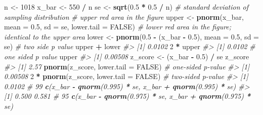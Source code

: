 \documentclass[]{book}
\newenvironment{Shaded}{\begin{snugshade}}{\end{snugshade}}
\newcommand{\KeywordTok}[1]{\textcolor[rgb]{0.13,0.29,0.53}{\textbf{#1}}}
\newcommand{\DataTypeTok}[1]{\textcolor[rgb]{0.13,0.29,0.53}{#1}}
\newcommand{\DecValTok}[1]{\textcolor[rgb]{0.00,0.00,0.81}{#1}}
\newcommand{\FloatTok}[1]{\textcolor[rgb]{0.00,0.00,0.81}{#1}}
\newcommand{\StringTok}[1]{\textcolor[rgb]{0.31,0.60,0.02}{#1}}
\newcommand{\CommentTok}[1]{\textcolor[rgb]{0.56,0.35,0.01}{\textit{#1}}}
\newcommand{\OtherTok}[1]{\textcolor[rgb]{0.56,0.35,0.01}{#1}}
\newcommand{\OperatorTok}[1]{\textcolor[rgb]{0.81,0.36,0.00}{\textbf{#1}}}
\newcommand{\NormalTok}[1]{#1}
\theoremstyle{definition}
\theoremstyle{definition}
\theoremstyle{definition}
\theoremstyle{remark}
\begin{document}
\begin{Shaded}
\begin{Highlighting}[]
\NormalTok{n <-}\StringTok{ }\DecValTok{1018}
\NormalTok{x_bar <-}\StringTok{ }\DecValTok{550} \OperatorTok{/}\StringTok{ }\NormalTok{n}
\NormalTok{se <-}\StringTok{ }\KeywordTok{sqrt}\NormalTok{(}\FloatTok{0.5} \OperatorTok{*}\StringTok{ }\FloatTok{0.5} \OperatorTok{/}\StringTok{ }\NormalTok{n) }\CommentTok{# standard deviation of sampling distribution}
\CommentTok{# upper red area in the figure}
\NormalTok{upper <-}\StringTok{ }\KeywordTok{pnorm}\NormalTok{(x_bar, }\DataTypeTok{mean =} \FloatTok{0.5}\NormalTok{, }\DataTypeTok{sd =}\NormalTok{ se, }\DataTypeTok{lower.tail =} \OtherTok{FALSE}\NormalTok{)}
\CommentTok{# lower red area in the figure; identical to the upper area}
\NormalTok{lower <-}\StringTok{ }\KeywordTok{pnorm}\NormalTok{(}\FloatTok{0.5} \OperatorTok{-}\StringTok{ }\NormalTok{(x_bar }\OperatorTok{-}\StringTok{ }\FloatTok{0.5}\NormalTok{), }\DataTypeTok{mean =} \FloatTok{0.5}\NormalTok{, }\DataTypeTok{sd =}\NormalTok{ se)}
\CommentTok{# two side p value}
\NormalTok{upper }\OperatorTok{+}\StringTok{ }\NormalTok{lower}
\CommentTok{#> [1] 0.0102}
\DecValTok{2} \OperatorTok{*}\StringTok{ }\NormalTok{upper}
\CommentTok{#> [1] 0.0102}
\CommentTok{# one sided p value}
\NormalTok{upper}
\CommentTok{#> [1] 0.00508}
\NormalTok{z_score <-}\StringTok{ }\NormalTok{(x_bar }\OperatorTok{-}\StringTok{ }\FloatTok{0.5}\NormalTok{) }\OperatorTok{/}\StringTok{ }\NormalTok{se}
\NormalTok{z_score}
\CommentTok{#> [1] 2.57}
\KeywordTok{pnorm}\NormalTok{(z_score, }\DataTypeTok{lower.tail =} \OtherTok{FALSE}\NormalTok{) }\CommentTok{# one-sided p-value}
\CommentTok{#> [1] 0.00508}
\DecValTok{2} \OperatorTok{*}\StringTok{ }\KeywordTok{pnorm}\NormalTok{(z_score, }\DataTypeTok{lower.tail =} \OtherTok{FALSE}\NormalTok{) }\CommentTok{# two-sided p-value}
\CommentTok{#> [1] 0.0102}
\CommentTok{# 99% confidence interval contains 0.5}
\KeywordTok{c}\NormalTok{(x_bar }\OperatorTok{-}\StringTok{ }\KeywordTok{qnorm}\NormalTok{(}\FloatTok{0.995}\NormalTok{) }\OperatorTok{*}\StringTok{ }\NormalTok{se, x_bar }\OperatorTok{+}\StringTok{ }\KeywordTok{qnorm}\NormalTok{(}\FloatTok{0.995}\NormalTok{) }\OperatorTok{*}\StringTok{ }\NormalTok{se)}
\CommentTok{#> [1] 0.500 0.581}
\CommentTok{# 95% confidence interval does not contain 0.5}
\KeywordTok{c}\NormalTok{(x_bar }\OperatorTok{-}\StringTok{ }\KeywordTok{qnorm}\NormalTok{(}\FloatTok{0.975}\NormalTok{) }\OperatorTok{*}\StringTok{ }\NormalTok{se, x_bar }\OperatorTok{+}\StringTok{ }\KeywordTok{qnorm}\NormalTok{(}\FloatTok{0.975}\NormalTok{) }\OperatorTok{*}\StringTok{ }\NormalTok{se)}
}}
\end{Highlighting}
\end{Shaded}
\end{document}
